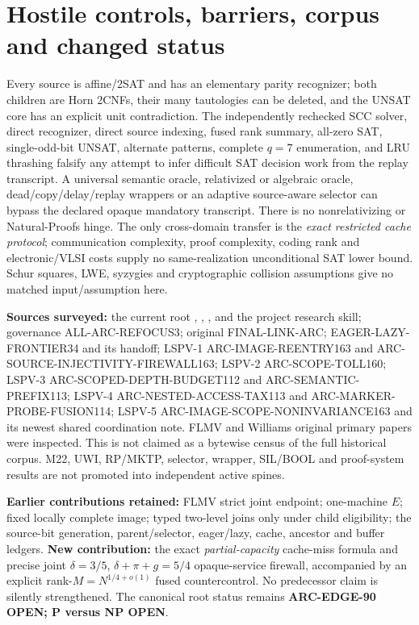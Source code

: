 \documentclass[11pt]{article}
\begin{document}
\section{Hostile controls, barriers, corpus and changed status}
Every source is affine/2SAT and has an elementary parity recognizer;
both children are Horn 2CNFs, their many tautologies can be deleted,
and the UNSAT core has an explicit unit contradiction. The
independently rechecked SCC solver, direct recognizer, direct source
indexing, fused rank summary, all-zero SAT, single-odd-bit UNSAT,
alternate patterns, complete $q=7$ enumeration, and LRU
thrashing falsify any attempt to infer difficult SAT decision
work from the replay transcript. A universal semantic oracle,
relativized or algebraic oracle, dead/copy/delay/replay wrappers
or an adaptive source-aware selector can bypass the declared
opaque mandatory transcript. There is no nonrelativizing or
Natural-Proofs hinge. The only cross-domain transfer is the
\emph{exact restricted cache protocol}; communication
complexity, proof complexity, coding rank and electronic/VLSI
costs supply no same-realization unconditional SAT lower bound.
Schur squares, LWE, syzygies and cryptographic collision
assumptions give no matched input/assumption here.

\textbf{Sources surveyed:}
the current root , ,
,  and the project research skill;
governance ALL-ARC-REFOCUS3; original FINAL-LINK-ARC;
EAGER-LAZY-FRONTIER34 and its handoff;
LSPV-1 ARC-IMAGE-REENTRY163 and
ARC-SOURCE-INJECTIVITY-FIREWALL163;
LSPV-2 ARC-SCOPE-TOLL160;
LSPV-3 ARC-SCOPED-DEPTH-BUDGET112 and
ARC-SEMANTIC-PREFIX113;
LSPV-4 ARC-NESTED-ACCESS-TAX113 and
ARC-MARKER-PROBE-FUSION114;
LSPV-5 ARC-IMAGE-SCOPE-NONINVARIANCE163
and its newest shared coordination note.
FLMV and Williams original primary papers were inspected.
This is not claimed as a bytewise census of the full historical corpus.
M22, UWI, RP/MKTP, selector, wrapper, SIL/BOOL and proof-system
results are not promoted into independent active spines.

\textbf{Earlier contributions retained:}
FLMV strict joint endpoint; one-machine $E$;
fixed locally complete image;
typed two-level joins only under child eligibility;
the source-bit generation, parent/selector, eager/lazy,
cache, ancestor and buffer ledgers.
\textbf{New contribution:} the exact \emph{partial-capacity}
cache-miss formula and precise joint $\delta=3/5$,
$\delta+\pi+g=5/4$ opaque-service firewall, accompanied
by an explicit rank-$M=N^{1/4+o(1)}$ fused countercontrol.
No predecessor claim is silently strengthened.
The canonical root status remains
\textbf{ARC-EDGE-90 OPEN; P versus NP OPEN}.
\end{document}
